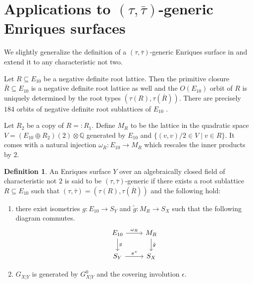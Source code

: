 \documentclass{amsart}
\theoremstyle{definition}
\newtheorem{definition}{Definition}[section]
\theoremstyle{plain}
\newcommand{\QQ}{\mathbb{Q}}
\newcommand{\taubar}{\bar{\tau}}
\begin{document}
\section{Applications to \texorpdfstring{\((\tau,\taubar)\)}{(tau,taubar)}-generic Enriques surfaces} \label{sect:tau-taubar}
We slightly generalize the definition of a $(\tau,\taubar)$-generic Enriques surface in \cite{brandhorst_shimada:tautaubar} and extend it to any characteristic not two.

Let $R \subseteq E_{10}$ be a negative definite root lattice.
Then the primitive closure $\overline{R} \subseteq E_{10}$ is a negative definite root lattice as well and the $O(E_{10})$ orbit of $R$ is uniquely determined by the root types
$(\tau(R),\tau(\overline{R}))$. There are precisely $184$ orbits of negative definite root sublattices of $E_{10}$ \cite[Proposition 1.2]{brandhorst_shimada:tautaubar}.

Let $R_2$ be a copy of $R=:R_1$. Define
$M_R$ to be the lattice in the quadratic space $V = (E_{10}\oplus R_2)(2) \otimes \QQ$ generated by $E_{10}$ and $\{(v,v)/2 \in V \mid v \in R\}$. It comes with a natural injection $\omega_R \colon E_{10} \to M_R$ which rescales the inner products by $2$.

\begin{definition}\label{def:tautaubar-generic}
An Enriques surface $Y$ over an algebraically closed field of characteristic not $2$ is said to be $(\tau,\taubar)$-generic if
there exists a root sublattice $R \subseteq E_{10}$ such that $(\tau,\taubar)= (\tau(R),\tau(\overline{R}))$ and the following hold:
\begin{enumerate}
\item there exist isometries $g \colon E_{10} \to  S_Y$
and $\tilde{g} \colon M_R \to S_X$ such that the following diagram commutes.
\begin{equation*} %
\begin{tikzcd}
   E_{10} \arrow[r]{}{\omega_R}\arrow[d]{}{g} &M_R \arrow[d]{}{\tilde{g}}\\
 S_Y\arrow[r]{}{\pi^*} &S_X
\end{tikzcd}
\end{equation*}
\item $G_{X|Y}$ is generated by $G_{X|Y}^0$ and the covering involution $\epsilon$.
\end{enumerate}
\end{definition}
\end{document}

